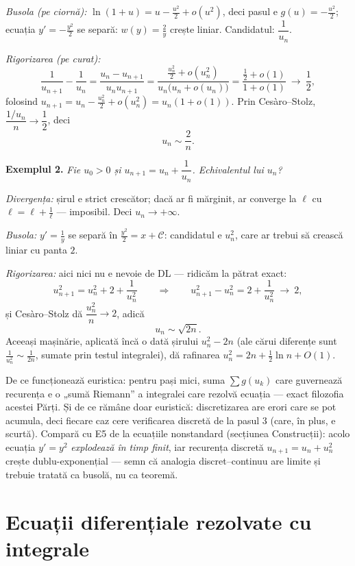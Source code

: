 \emph{Busola (pe ciornă):} $\ln(1+u)=u-\frac{u^2}{2}+o(u^2)$, deci pasul e $g(u)=-\frac{u^2}{2}$; ecuația $y'=-\frac{y^2}{2}$ se separă: $w(y)=\frac{2}{y}$ crește liniar. Candidatul: $\dfrac1{u_n}$.

\emph{Rigorizarea (pe curat):}
\[
\frac{1}{u_{n+1}}-\frac{1}{u_n}
=\frac{u_n-u_{n+1}}{u_nu_{n+1}}
=\frac{\frac{u_n^2}{2}+o(u_n^2)}{u_n\big(u_n+o(u_n)\big)}
=\frac{\frac12+o(1)}{1+o(1)}\ \longrightarrow\ \frac12,
\]
folosind $u_{n+1}=u_n-\frac{u_n^2}{2}+o(u_n^2)=u_n(1+o(1))$. Prin Cesàro--Stolz, $\dfrac{1/u_n}{n}\to\dfrac12$, deci
\[
\boxed{\;u_n\sim\frac{2}{n}.\;}
\]

\textbf{Exemplul 2.} \emph{Fie $u_0>0$ și $u_{n+1}=u_n+\dfrac{1}{u_n}$. Echivalentul lui $u_n$?}

\emph{Divergența:} șirul e strict crescător; dacă ar fi mărginit, ar converge la $\ell$ cu $\ell=\ell+\frac1\ell$ --- imposibil. Deci $u_n\to+\infty$.

\emph{Busola:} $y'=\frac1y$ se separă în $\frac{y^2}{2}=x+\mathcal C$: candidatul e $u_n^2$, care ar trebui să crească liniar cu panta $2$.

\emph{Rigorizarea:} aici nici nu e nevoie de DL --- ridicăm la pătrat exact:
\[
u_{n+1}^{2}=u_n^{2}+2+\frac{1}{u_n^{2}}
\qquad\Longrightarrow\qquad
u_{n+1}^2-u_n^2=2+\frac{1}{u_n^2}\ \longrightarrow\ 2,
\]
și Cesàro--Stolz dă $\dfrac{u_n^2}{n}\to2$, adică
\[
\boxed{\;u_n\sim\sqrt{2n}.\;}
\]
 Aceeași mașinărie, aplicată încă o dată șirului $u_n^2-2n$ (ale cărui diferențe sunt $\frac{1}{u_n^2}\sim\frac{1}{2n}$, sumate prin testul integralei), dă rafinarea $u_n^2=2n+\frac12\ln n+O(1)$.

\begin{obs}
De ce funcționează euristica: pentru pași mici, suma $\sum g(u_k)$ care guvernează recurența e o „sumă Riemann'' a integralei care rezolvă ecuația --- exact filozofia acestei Părți. Și de ce rămâne doar euristică: discretizarea are erori care se pot acumula, deci fiecare caz cere verificarea discretă de la pasul 3 (care, în plus, e scurtă). Compară cu E5 de la ecuațiile nonstandard (secțiunea Construcții): acolo ecuația $y'=y^2$ \emph{explodează în timp finit}, iar recurența discretă $u_{n+1}=u_n+u_n^2$ crește dublu-exponențial --- semn că analogia discret--continuu are limite și trebuie tratată ca busolă, nu ca teoremă.
\end{obs}

\section{Ecuații diferențiale rezolvate cu integrale}

